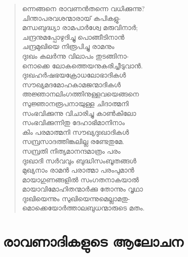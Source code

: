 \begin{verse}
ന്നെങ്ങനെ രാവണന്‍തന്നെ വധിക്കുന്നു?\\
ചിന്താപരവശന്മാരായ് കപികളു-\\
മന്ധബുദ്ധ്യാ രാമപാര്‍ശ്വേ മരുവിനാര്‍;\\
ചന്ദ്രനുമപ്പോഴുദിച്ചു പൊങ്ങീടിനാന്‍\\
ചന്ദ്രമുഖിയെ നിരൂപിച്ചു രാമനും\\
ദുഃഖം കലര്‍ന്നു വിലാപം തുടങ്ങിനാ-\\
നൊക്കെ ലോകത്തെയനുകരിച്ചീടുവാന്‍.\\
ദുഃഖഹര്‍ഷഭയക്രോധലോഭാദികള്‍\\
സൗഖ്യമദമോഹകാമജന്മാദികള്‍\\
അജ്ഞാനലിംഗത്തിനുള്ളവയെങ്ങനെ\\
സുജ്ഞാനരൂപനായുള്ള ചിദാത്മനി\\
സംഭവിക്കുന്നു വിചാരിച്ചു കാണ്‍കിലോ\\
സംഭവിക്കുന്നിതു ദേഹാഭിമാനിനാം\\
കിം പരമാത്മനി സൗഖ്യദുഃഖാദികള്‍\\
സമ്പ്രസാദത്തിങ്കലില്ല രണ്ടേതുമേ.\\
സമ്പ്രതി നിത്യമാനന്ദമാത്രം പരം\\
ദുഃഖാദി സര്‍വവും ബുദ്ധിസംബൂതങ്ങള്‍\\
മുഖ്യനാം രാമന്‍ പരാത്മാ പരംപുമാന്‍\\
മായാഗുണങ്ങളില്‍ സംഗതനാകയാല്‍\\
മായാവിമോഹിതന്മാര്‍ക്കു തോന്നും വൃഥാ\\
ദുഃഖിയെന്നും സുഖിയെന്നുമെല്ലാമതു-\\
മൊക്കെയോര്‍ത്താലബുധന്മാരുടെ മതം.
\end{verse}


\section{രാവണാദികളുടെ ആലോചന}

